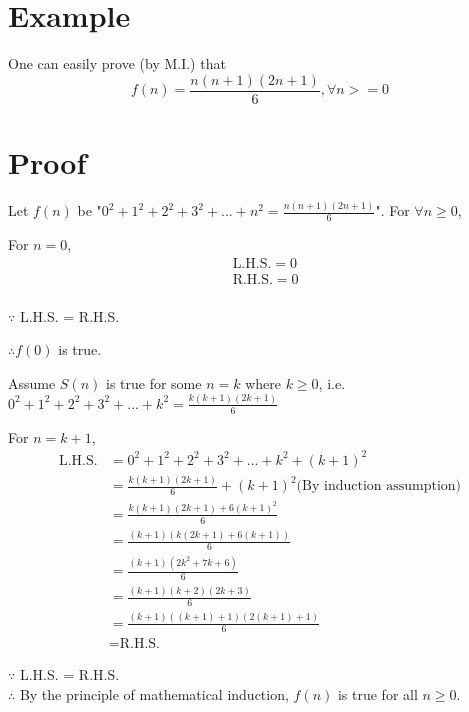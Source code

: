 \documentclass{article}
\begin{document}
\section*{Example}
One can easily prove (by M.I.) that
\begin{equation}
   f(n) = \frac{n(n+1)(2n+1)}{6}, \forall n >= 0
\end{equation}

\section*{Proof}

\begin{flushleft}
Let $f(n)$ be "$0^2+1^2+2^2+3^2+...+n^2=\frac{n(n+1)(2n+1)}{6}$".
For $\forall n \geq 0$,
\end{flushleft}

For $n=0$,
\begin{align*}
   & \text{L.H.S.} = 0 \\
   & \text{R.H.S.} = 0 \\
\end{align*}

$\because$ L.H.S. = R.H.S.

$\therefore f(0)$ is true.

\begin{flushleft}

   Assume $S(n)$ is true for some $n=k$ where $k \geq 0$,
   i.e. $0^2+1^2+2^2+3^2+...+k^2=\frac{k(k+1)(2k+1)}{6}$

\end{flushleft}

For $n=k+1$,
\begin{align*}
\text{L.H.S.} &= 0^2+1^2+2^2+3^2+...+k^2+(k+1)^2 \\
&= \frac{k(k+1)(2k+1)}{6}+(k+1)^2 
\text{(By induction assumption)} \\
&= \frac{k(k+1)(2k+1)+6(k+1)^2}{6} \\
&= \frac{(k+1)(k(2k+1)+6(k+1))}{6} \\
&= \frac{(k+1)(2k^2+7k+6)}{6} \\
&= \frac{(k+1)(k+2)(2k+3)}{6} \\
&= \frac{(k+1)((k+1)+1)(2(k+1)+1)}{6} \\
&= \text{R.H.S.}
\end{align*}

\begin{flushleft}
   $\because$ L.H.S. = R.H.S. \\
   $\therefore$ By the principle of mathematical induction,
   $f(n)$ is true for all $n \geq 0$.
\end{flushleft}
\end{document}
